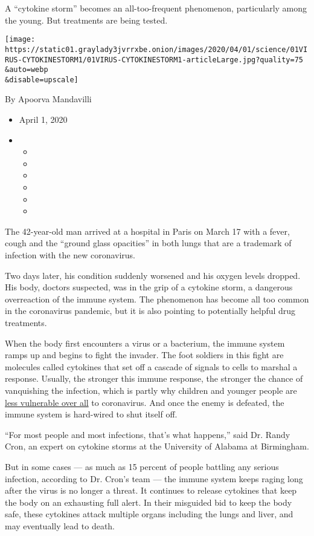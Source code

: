 A ``cytokine storm'' becomes an all-too-frequent phenomenon,
particularly among the young. But treatments are being tested.

\texttt{[image: https://static01.graylady3jvrrxbe.onion/images/2020/04/01/science/01VIRUS-CYTOKINESTORM1/01VIRUS-CYTOKINESTORM1-articleLarge.jpg?quality=75\\\&auto=webp\\\&disable=upscale]}

By Apoorva Mandavilli

\begin{itemize}
\item
  April 1, 2020
\item
  \begin{itemize}
  \item
  \item
  \item
  \item
  \item
  \item
  \end{itemize}
\end{itemize}

The 42-year-old man arrived at a hospital in Paris on March 17 with a
fever, cough and the ``ground glass opacities'' in both lungs that are a
trademark of infection with the new coronavirus.

Two days later, his condition suddenly worsened and his oxygen levels
dropped. His body, doctors suspected, was in the grip of a cytokine
storm, a dangerous overreaction of the immune system. The phenomenon has
become all too common in the coronavirus pandemic, but it is also
pointing to potentially helpful drug treatments.

When the body first encounters a virus or a bacterium, the immune system
ramps up and begins to fight the invader. The foot soldiers in this
fight are molecules called cytokines that set off a cascade of signals
to cells to marshal a response. Usually, the stronger this immune
response, the stronger the chance of vanquishing the infection, which is
partly why children and younger people are
\href{https://www.nytimes3xbfgragh.onion/2020/02/05/health/coronavirus-children.html}{less
vulnerable over all} to coronavirus. And once the enemy is defeated, the
immune system is hard-wired to shut itself off.

``For most people and most infections, that's what happens,'' said Dr.
Randy Cron, an expert on cytokine storms at the University of Alabama at
Birmingham.

But in some cases --- as much as 15 percent of people battling any
serious infection, according to Dr. Cron's team --- the immune system
keeps raging long after the virus is no longer a threat. It continues to
release cytokines that keep the body on an exhausting full alert. In
their misguided bid to keep the body safe, these cytokines attack
multiple organs including the lungs and liver, and may eventually lead
to death.

